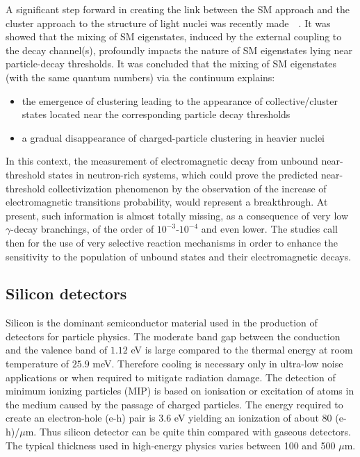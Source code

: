 \bigbreak

A significant step forward in creating the link between the SM approach and
the cluster approach to the structure of light nuclei was recently
made~\cite{oko:cluster}~\cite{oko:origin}.
It was showed that the mixing of SM eigenstates, induced by the external
coupling to the decay channel(s), profoundly impacts the nature of SM
eigenstates lying near particle-decay thresholds. 
It was concluded that the mixing of SM eigenstates (with the same quantum
numbers) via the continuum explains:

\begin{itemize}
\item the emergence of clustering leading to the appearance of
collective/cluster states located near the corresponding particle decay
thresholds
\item a gradual disappearance of charged-particle clustering in heavier nuclei
\end{itemize}

\bigbreak

In this context, the measurement of electromagnetic decay from unbound
near-threshold states in neutron-rich systems, which could prove the predicted
near-threshold collectivization phenomenon by the observation of the increase
of electromagnetic transitions probability, would represent a breakthrough.
At present, such information is almost totally missing, as a consequence of
very low  $\gamma$-decay branchings, of the order of $10^{-3}$-$10^{-4}$ and
even lower. The studies call then for the use of very selective reaction
mechanisms in order to enhance the sensitivity to
the population of unbound states and their electromagnetic decays.



\subsection{Silicon detectors}

Silicon is the dominant semiconductor material used in the production of
detectors for particle physics. The moderate band gap between the conduction
and the valence band of $1.12$ eV is large compared to the thermal
energy at room temperature of $25.9$ meV. Therefore cooling is necessary
only in ultra-low noise applications or when required to mitigate radiation
damage. The detection of minimum ionizing particles (MIP) is based on
ionisation or excitation of atoms in the medium caused by the passage of
charged particles. The energy required to create an electron-hole (e-h) pair
is $3.6$ eV yielding an ionization of about 80 (e-h)/$\mu$m. Thus silicon
detector can be quite thin compared with gaseous detectors. The typical
thickness used in high-energy physics varies between 100 and 500 $\mu$m.


